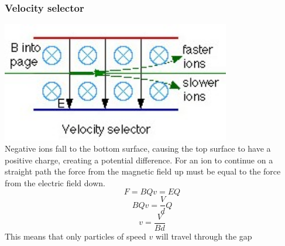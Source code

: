 \documentclass{article}[18pt]
\begin{document}
\subsubsection{Velocity selector}
\includegraphics[width=10cm]{velocity_selector.jpg}\\
Negative ions fall to the bottom surface, causing the top surface to have a positive charge, creating a potential difference. For an ion to continue on a straight path the force from the magnetic field up must be equal to the force from the electric field down.\\
$$F=BQv=EQ$$
$$BQv=\dfrac{V}{d}Q$$
$$v=\dfrac{V}{Bd}$$
This means that only particles of speed $v$ will travel through the gap
\end{document}
